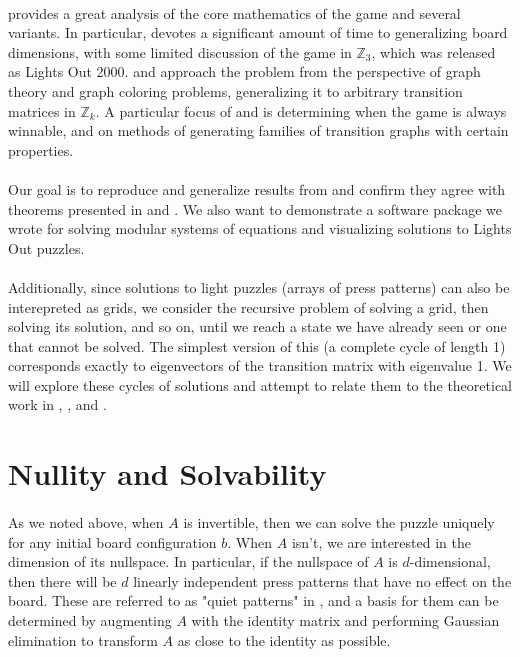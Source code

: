 \documentclass[11pt]{article}
\begin{document}
\paragraph{} \cite{jaap} provides a great analysis of the core mathematics of the game and several variants. In particular, \cite{jaap} devotes a significant amount of time to generalizing board dimensions, with some limited discussion of the game in $\mathbb{Z}_3$, which was released as Lights Out 2000. \cite{giffen} and \cite{involve} approach the problem from the perspective of graph theory and graph coloring problems, generalizing it to arbitrary transition matrices in $\mathbb{Z}_k$. A particular focus of \cite{giffen} and \cite{involve} is determining when the game is always winnable, and on methods of generating families of transition graphs with certain properties.

\paragraph{} Our goal is to reproduce and generalize results from \cite{jaap} and confirm they agree with theorems presented in \cite{giffen} and \cite{involve}. We also want to demonstrate a software package we wrote for solving modular systems of equations and visualizing solutions to Lights Out puzzles.

\paragraph{} Additionally, since solutions to light puzzles (arrays of press patterns) can also be interepreted as grids, we consider the recursive problem of solving a grid, then solving its solution, and so on, until we reach a state we have already seen or one that cannot be solved. The simplest version of this (a complete cycle of length 1) corresponds exactly to eigenvectors of the transition matrix with eigenvalue 1. We will explore these cycles of solutions and attempt to relate them to the theoretical work in \cite{jaap}, \cite{giffen}, and \cite{involve}.

\section*{Nullity and Solvability}

\paragraph{} As we noted above, when $A$ is invertible, then we can solve the puzzle uniquely for any initial board configuration $b$. When $A$ isn't, we are interested in the dimension of its nullspace. In particular, if the nullspace of $A$ is $d$-dimensional, then there will be $d$ linearly independent press patterns that have no effect on the board. These are referred to as "quiet patterns" in \cite{jaap}, and a basis for them can be determined by augmenting $A$ with the identity matrix and performing Gaussian elimination to transform $A$ as close to the identity as possible.
\end{document}

